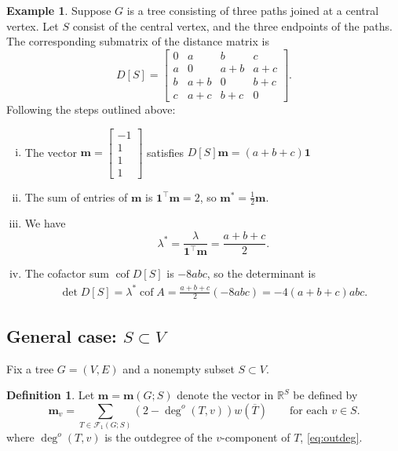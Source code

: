 \documentclass{amsart}
\theoremstyle{definition}
\newtheorem{dfn}[thm]{Definition}
\newtheorem{eg}[thm]{Example}
\newcommand{\RR}{\mathbb{R}}
\newcommand{\bone}{\mathbf{1}}
\newcommand{\boldm}{\mathbf{m}}
\newcommand{\tr}{\intercal}
\DeclareMathOperator{\cof}{cof}
\newcommand{\trees}{\mathcal{F}_1}
\newcommand{\degout}{\deg^o}
\begin{document}
\begin{eg}
Suppose $G$ is a tree consisting of three paths joined at a central vertex.
Let $S$ consist of the central vertex, and the three endpoints of the paths. 
The corresponding submatrix of the distance matrix is
$$
D[S] = \begin{bmatrix}
0 & a & b & c \\
a & 0 & a + b & a + c \\
b & a + b & 0 & b + c \\
c & a + c & b + c & 0
\end{bmatrix}.
$$
Following the steps outlined above:
\begin{enumerate}[(i)]
\item 
The vector $\boldm = \begin{bmatrix} -1 \\ 1 \\ 1 \\ 1 \end{bmatrix}$ satisfies
$
D[S] \boldm = (a+b+c) \mathbf{1}
$

\item 
The sum of entries of $\boldm$ is $\mathbf{1}^\tr \boldm = 2$,
so $\boldm^* = \frac12 \boldm$.

\item 
We have 
\[
\lambda^* = \frac{\lambda}{\bone^\tr\boldm} = \frac{a + b + c}{2} .
\]

\item 
The cofactor sum  
$\cof D[S]$ is $-8 abc$,
so the determinant is
\begin{align*}
\det D[S] 
= \lambda^* \cof A
= \frac{a + b + c}{2} (-8 abc)
= -4(a + b + c) abc.
\end{align*}
\end{enumerate}
\end{eg}

\subsection{General case: $S \subset V$}
Fix a tree $G = (V,E)$ and a nonempty subset $S \subset V$.
\begin{dfn}
\label{dfn:m-vector}
Let $\boldm = \boldm(G;S)$ denote the vector in $\RR^S$ be defined by
\begin{equation}
\label{eq:m-vector}
\boldm_v =  \sum_{T \in \trees(G;S)} (2 - \degout(T,v)) w(\overline{T})
\qquad\text{for each }v \in S.
\end{equation}
where $\degout(T,v)$ is the outdegree of the $v$-component of $T$, \eqref{eq:outdeg}.
\end{dfn}
\end{document}
